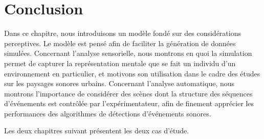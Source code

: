 \section{Conclusion}

Dans ce chapitre, nous introduisons un modèle fondé sur des considérations perceptives. Le modèle est pensé afin de faciliter la génération de données simulées. Concernant l'analyse sensorielle, nous montrons en quoi la simulation permet de capturer la représentation mentale que se fait un individu d'un environnement en particulier, et motivons son utilisation dans le cadre des études sur les paysages sonores urbains. Concernant l'analyse automatique, nous montrons l'importance de considérer des scènes dont la structure des séquences d'événements est contrôlée par l'expérimentateur, afin de finement apprécier les performances des algorithmes de détections d'événements sonores.

Les deux chapitres suivant présentent les deux cas d'étude.

